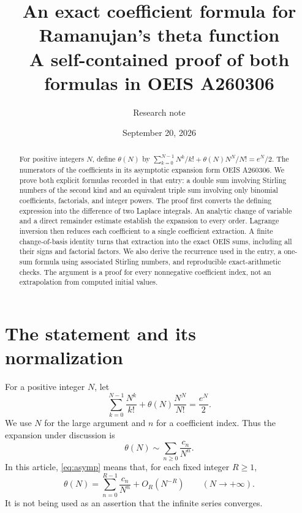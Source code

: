 \documentclass[11pt,letterpaper]{article}
\title{An exact coefficient formula for\\[2pt]Ramanujan's theta function\\[6pt]
  \large A self-contained proof of both formulas in OEIS A260306}
\author{Research note}
\date{September 20, 2026}
\numberwithin{equation}{section}
\theoremstyle{remark}
\begin{document}
\maketitle
\thispagestyle{empty}
\begin{abstract}
For positive integers $N$, define $\theta(N)$ by
$\sum_{k=0}^{N-1}N^k/k!+\theta(N)N^N/N!=e^N/2$.
The numerators of the coefficients in its asymptotic expansion form OEIS
A260306. We prove both explicit formulas recorded in that entry: a double
sum involving Stirling numbers of the second kind and an equivalent triple
sum involving only binomial coefficients, factorials, and integer powers.
The proof first converts the defining expression into the difference of
two Laplace integrals. An analytic change of variable and a direct remainder
estimate establish the expansion to every order. Lagrange inversion then
reduces each coefficient to a single coefficient extraction. A finite
change-of-basis identity turns that extraction into the exact OEIS sums,
including all their signs and factorial factors. We also derive the
recurrence used in the entry, a one-sum formula using associated Stirling
numbers, and reproducible exact-arithmetic checks. The argument is a proof
for every nonnegative coefficient index, not an extrapolation from computed
initial values.
\end{abstract}

\section{The statement and its normalization}
\label{sec:statement}

For a positive integer $N$, let
\begin{equation}
 \sum_{k=0}^{N-1}\frac{N^k}{k!}
 +\theta(N)\frac{N^N}{N!}=\frac{e^N}{2}.
 \label{eq:def}
\end{equation}
We use $N$ for the large argument and $n$ for a coefficient index. Thus the
expansion under discussion is
\begin{equation}
 \theta(N)\sim\sum_{n\geq 0}\frac{c_n}{N^n}.
 \label{eq:asymp}
\end{equation}
In this article, \eqref{eq:asymp} means that, for each fixed integer $R\geq1$,
\begin{equation}
 \theta(N)=\sum_{n=0}^{R-1}\frac{c_n}{N^n}+O_R(N^{-R})
 \qquad(N\longrightarrow+\infty).
 \label{eq:poincare}
\end{equation}
It is not being used as an assertion that the infinite series converges.
\end{document}
